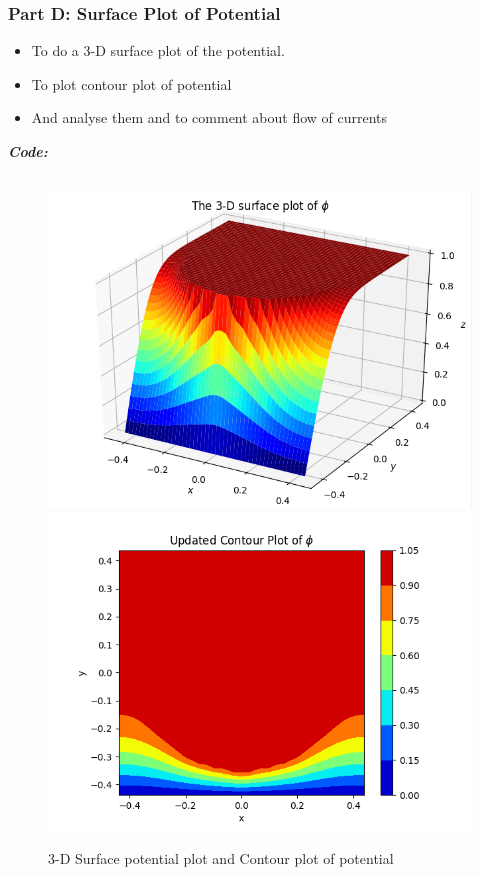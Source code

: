 \documentclass[11pt, a4paper, twoside]{article}
\begin{document}
\subsubsection{Part D: Surface Plot of
Potential}\label{part-d-surface-plot-of-potential}

\begin{itemize}
\item
  To do a 3-D surface plot of the potential.
\item
  To plot contour plot of potential
\item
  And analyse them and to comment about flow of currents
\end{itemize}
\textit{\textbf{Code:}}
\inputminted[linenos, breaklines]{python}{Code/5.py}
\begin{figure}[!tbh]
 \centering
 \includegraphics[scale=0.8]{Plots/Fig5.png}  
 \includegraphics[scale=0.8]{Plots/Fig6.png}  
 \caption{3-D Surface potential plot and Contour plot of potential}
\end{figure}
\end{document}

